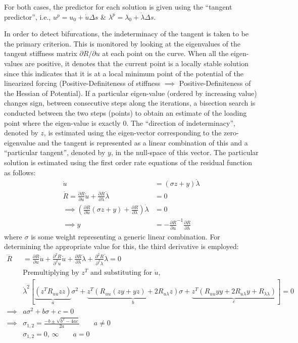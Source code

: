 \documentclass[10pt]{article}
\begin{document}
For both cases, the predictor for each solution is given using the
``tangent predictor'', i.e., $u^p = u_0+\dot{u}\Delta s$ \& $\lambda^p
= \lambda_0+\dot{\lambda}\Delta s$.

In order to detect bifurcations, the indeterminacy of the tangent is
taken to be the primary criterion. This is monitored by looking at the
eigenvalues of the tangent stiffness matrix $\partial R/\partial u$ at
each point on the curve. When all the eigen-values are positive, it
denotes that the current point is a locally stable solution since this
indicates that it is at a local minimum point of the potential of the
linearized forcing (Positive-Definiteness of stiffness $\implies$
Positive-Definiteness of the Hessian of Potential). If a particular
eigen-value (ordered by increasing value) changes sign, between
consecutive steps along the iterations, a bisection search is
conducted between the two steps (points) to obtain an estimate of the
loading point where the eigen-value is exactly $0$. The ``direction of
indeterminacy'', denoted by $z$, is estimated using the eigen-vector
corresponding to the zero-eigenvalue and the tangent is represented as
a linear combination of this and a ``particular tangent'', denoted by
$y$, in the null-space of this vector. The particular solution is
estimated using the first order rate equations of the residual
function as follows:
\begin{align*}
  \dot{u} &= (\sigma z + y)\dot{\lambda}\\
  \dot{R} = \frac{\partial R}{\partial u}\dot{u} + \frac{\partial R}{\partial \lambda}\dot{\lambda} &= 0\\
  \implies \left( \frac{\partial R}{\partial u}(\sigma z + y) +
  \frac{\partial R}{\partial \lambda} \right)\dot{\lambda} &= 0\\
  \implies y &= -{\frac{\partial R}{\partial u}}^{-1} \frac{\partial
               R}{\partial \lambda}
\end{align*}
where $\sigma$ is some weight representing a generic linear
combination. For determining the appropriate value for this, the third
derivative is employed:
\begin{align}
  \ddddot{R} &= \frac{\partial R}{\partial u}\ddot{u} +
               \frac{\partial^2 R}{\partial^2 u}\dot{u} +
               \frac{\partial R}{\partial \lambda}\ddot{\lambda} +
               \frac{\partial^2 R}{\partial^2 \lambda}\dot{\lambda} =
               0\nonumber\\
  &\text{Premultiplying by $z^T$ and substituting for
    $\dot{u}$},\nonumber\\
  &\dot{\lambda}^2[ \underbrace{\left(z^TR_{uu}zz\right)}_{a}\sigma^2 +
    \underbrace{z^T\left(R_{uu}(zy+yz)+2R_{u\lambda}z\right)}_{b} \sigma + \underbrace{z^T\left(
  R_{uu}yy + 2R_{u\lambda}y + R_{\lambda\lambda}\right)}_c ] =
    0\nonumber\\
  \implies &a\sigma^2 + b\sigma + c = 0\nonumber\\
  \implies &\sigma_{1,2} = \frac{-b \pm \sqrt{b^2-4ac}}{2a}\qquad
             a \neq 0\nonumber\\
  &\sigma_{1,2} = 0,\, \infty\qquad a = 0
  \label{eq:d3}
\end{align}
\end{document}
